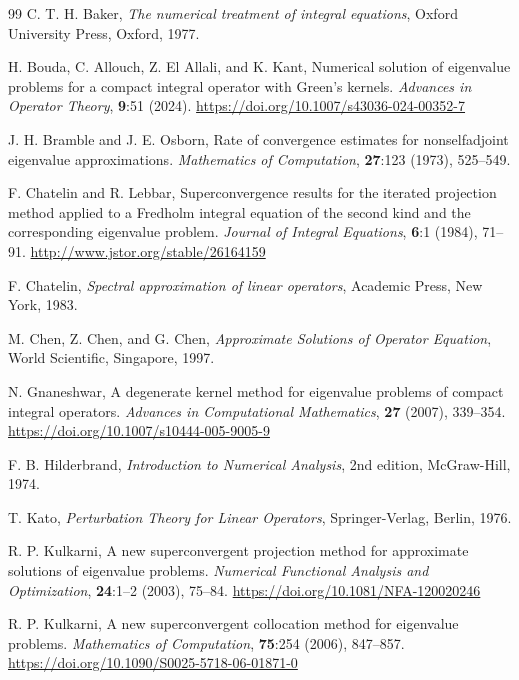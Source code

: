 \documentclass[]{interact}
\theoremstyle{plain}%
\theoremstyle{definition}
\theoremstyle{remark}
\begin{document}
\begin{thebibliography}{99}
	C. T. H. Baker, \textit{The numerical treatment of integral equations}, Oxford University Press, Oxford, 1977.
	
	H. Bouda, C. Allouch, Z. El Allali, and K. Kant, Numerical solution of eigenvalue problems for a compact integral operator with Green's kernels. \textit{Advances in Operator Theory}, \textbf{9}:51 (2024).  
	\url{https://doi.org/10.1007/s43036-024-00352-7}
	
	J. H. Bramble and J. E. Osborn, Rate of convergence estimates for nonselfadjoint eigenvalue approximations. \textit{Mathematics of Computation}, \textbf{27}:123 (1973), 525--549.
	
	F. Chatelin and R. Lebbar, Superconvergence results for the iterated projection method applied to a Fredholm integral equation of the second kind and the corresponding eigenvalue problem. \textit{Journal of Integral Equations}, \textbf{6}:1 (1984), 71--91. 
	\url{http://www.jstor.org/stable/26164159}
	
	F. Chatelin, \textit{Spectral approximation of linear operators}, Academic Press, New York, 1983.
	
	M. Chen, Z. Chen, and G. Chen, \textit{Approximate Solutions of Operator Equation}, World Scientific, Singapore, 1997.
	
	N. Gnaneshwar, A degenerate kernel method for eigenvalue problems of compact integral operators. \textit{Advances in Computational Mathematics}, \textbf{27} (2007), 339--354.
	\url{https://doi.org/10.1007/s10444-005-9005-9}
	
	F. B. Hilderbrand, \textit{Introduction to Numerical Analysis}, 2nd edition, McGraw-Hill, 1974.
	
	T. Kato, \textit{Perturbation Theory for Linear Operators}, Springer-Verlag, Berlin, 1976.
	
	R. P. Kulkarni, A new superconvergent projection method for approximate solutions of eigenvalue problems. \textit{Numerical Functional Analysis and Optimization}, \textbf{24}:1--2 (2003), 75--84.
	\url{https://doi.org/10.1081/NFA-120020246}
	
	R. P. Kulkarni, A new superconvergent collocation method for eigenvalue problems. \textit{Mathematics of Computation}, \textbf{75}:254 (2006), 847--857.
	\url{https://doi.org/10.1090/S0025-5718-06-01871-0}
	

\end{thebibliography}
\end{document}
